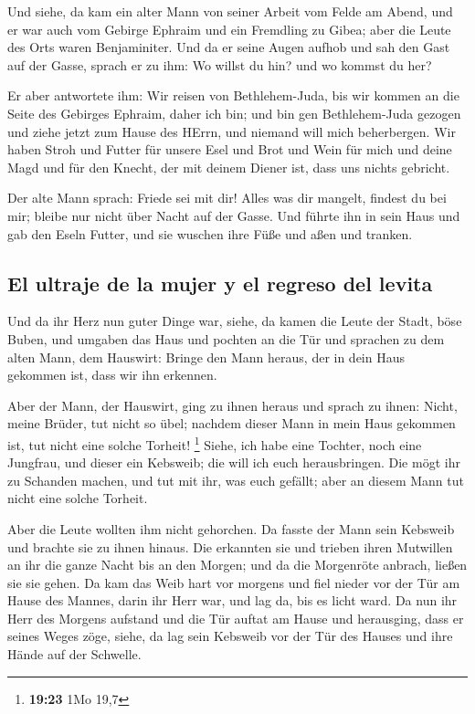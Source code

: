  Und siehe, da kam ein alter Mann von seiner Arbeit vom
Felde am Abend, und er war auch vom Gebirge Ephraim und ein Fremdling zu
Gibea; aber die Leute des Orts waren Benjaminiter.  Und
da er seine Augen aufhob und sah den Gast auf der Gasse, sprach er zu
ihm: Wo willst du hin? und wo kommst du her?

 Er aber antwortete ihm: Wir reisen von Bethlehem-Juda,
bis wir kommen an die Seite des Gebirges Ephraim, daher ich bin; und bin
gen Bethlehem-Juda gezogen und ziehe jetzt zum Hause des HErrn, und
niemand will mich beherbergen.  Wir haben Stroh und
Futter für unsere Esel und Brot und Wein für mich und deine Magd und für
den Knecht, der mit deinem Diener ist, dass uns nichts gebricht.

 Der alte Mann sprach: Friede sei mit dir! Alles was dir
mangelt, findest du bei mir; bleibe nur nicht über Nacht auf der Gasse.
 Und führte ihn in sein Haus und gab den Eseln Futter,
und sie wuschen ihre Füße und aßen und tranken.

\hypertarget{el-ultraje-de-la-mujer-y-el-regreso-del-levita}{%
\subsection{El ultraje de la mujer y el regreso del
levita}\label{el-ultraje-de-la-mujer-y-el-regreso-del-levita}}

 Und da ihr Herz nun guter Dinge war, siehe, da kamen die
Leute der Stadt, böse Buben, und umgaben das Haus und pochten an die Tür
und sprachen zu dem alten Mann, dem Hauswirt: Bringe den Mann heraus,
der in dein Haus gekommen ist, dass wir ihn erkennen.

 Aber der Mann, der Hauswirt, ging zu ihnen heraus und
sprach zu ihnen: Nicht, meine Brüder, tut nicht so übel; nachdem dieser
Mann in mein Haus gekommen ist, tut nicht eine solche Torheit!
\footnote{\textbf{19:23} 1Mo 19,7}  Siehe, ich habe eine
Tochter, noch eine Jungfrau, und dieser ein Kebsweib; die will ich euch
herausbringen. Die mögt ihr zu Schanden machen, und tut mit ihr, was
euch gefällt; aber an diesem Mann tut nicht eine solche Torheit.

 Aber die Leute wollten ihm nicht gehorchen. Da fasste
der Mann sein Kebsweib und brachte sie zu ihnen hinaus. Die erkannten
sie und trieben ihren Mutwillen an ihr die ganze Nacht bis an den
Morgen; und da die Morgenröte anbrach, ließen sie sie gehen.
 Da kam das Weib hart vor morgens und fiel nieder vor der
Tür am Hause des Mannes, darin ihr Herr war, und lag da, bis es licht
ward.  Da nun ihr Herr des Morgens aufstand und die Tür
auftat am Hause und herausging, dass er seines Weges zöge, siehe, da lag
sein Kebsweib vor der Tür des Hauses und ihre Hände auf der Schwelle.

